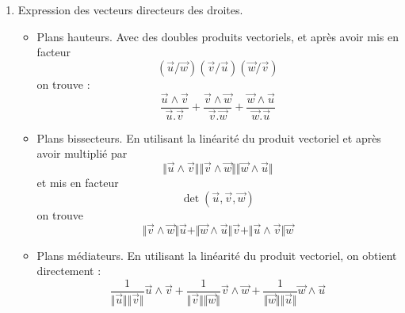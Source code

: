 \begin{enumerate}
\item Expression des vecteurs directeurs des droites.
\begin{itemize}
 \item Plans hauteurs. Avec des doubles produits vectoriels, et après avoir mis en facteur
\begin{displaymath}
 (\overrightarrow u / \overrightarrow w)(\overrightarrow v / \overrightarrow u)(\overrightarrow w / \overrightarrow v)
\end{displaymath}
on trouve :
\begin{displaymath}
 \frac{\overrightarrow{u}\wedge \overrightarrow{v}}{\overrightarrow{u}. \overrightarrow{v}} +
\frac{\overrightarrow{v}\wedge \overrightarrow{w}}{\overrightarrow{v}. \overrightarrow{w}} +
\frac{\overrightarrow{w}\wedge \overrightarrow{u}}{\overrightarrow{w}. \overrightarrow{u}}
\end{displaymath}
\item Plans bissecteurs. En utilisant la linéarité du produit vectoriel et après avoir multiplié par
\begin{displaymath}
 \Vert \overrightarrow{u}\wedge \overrightarrow{v} \Vert
\Vert \overrightarrow{v}\wedge \overrightarrow{w} \Vert
\Vert \overrightarrow{w}\wedge \overrightarrow{u} \Vert
\end{displaymath}
et mis en facteur 
\begin{displaymath}
 \det(\overrightarrow u,\overrightarrow v,\overrightarrow w)
\end{displaymath}
on trouve 
\begin{displaymath}
 \Vert \overrightarrow{v}\wedge \overrightarrow{w} \Vert \overrightarrow{u} +
\Vert \overrightarrow{w}\wedge \overrightarrow{u} \Vert \overrightarrow{v} +
\Vert \overrightarrow{u}\wedge \overrightarrow{v} \Vert \overrightarrow{w}
\end{displaymath}
\item Plans médiateurs. En utilisant la linéarité du produit vectoriel, on obtient directement :
\begin{displaymath}
 \frac{1}{\Vert \overrightarrow{u}\Vert \Vert \overrightarrow{v} \Vert}\overrightarrow{u}\wedge \overrightarrow{v} +
\frac{1}{\Vert \overrightarrow{v}\Vert \Vert \overrightarrow{w} \Vert}\overrightarrow{v}\wedge \overrightarrow{w} +
\frac{1}{\Vert \overrightarrow{w}\Vert \Vert \overrightarrow{u} \Vert}\overrightarrow{w}\wedge \overrightarrow{u}
\end{displaymath}


\end{itemize}



\end{enumerate}
